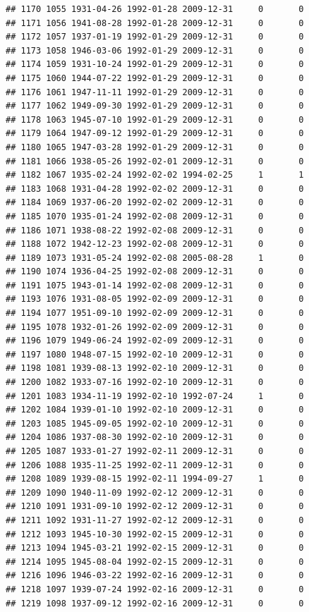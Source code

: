 \documentclass[
]{book}
\begin{document}
\begin{verbatim}
## 1170 1055 1931-04-26 1992-01-28 2009-12-31     0       0
## 1171 1056 1941-08-28 1992-01-28 2009-12-31     0       0
## 1172 1057 1937-01-19 1992-01-29 2009-12-31     0       0
## 1173 1058 1946-03-06 1992-01-29 2009-12-31     0       0
## 1174 1059 1931-10-24 1992-01-29 2009-12-31     0       0
## 1175 1060 1944-07-22 1992-01-29 2009-12-31     0       0
## 1176 1061 1947-11-11 1992-01-29 2009-12-31     0       0
## 1177 1062 1949-09-30 1992-01-29 2009-12-31     0       0
## 1178 1063 1945-07-10 1992-01-29 2009-12-31     0       0
## 1179 1064 1947-09-12 1992-01-29 2009-12-31     0       0
## 1180 1065 1947-03-28 1992-01-29 2009-12-31     0       0
## 1181 1066 1938-05-26 1992-02-01 2009-12-31     0       0
## 1182 1067 1935-02-24 1992-02-02 1994-02-25     1       1
## 1183 1068 1931-04-28 1992-02-02 2009-12-31     0       0
## 1184 1069 1937-06-20 1992-02-02 2009-12-31     0       0
## 1185 1070 1935-01-24 1992-02-08 2009-12-31     0       0
## 1186 1071 1938-08-22 1992-02-08 2009-12-31     0       0
## 1188 1072 1942-12-23 1992-02-08 2009-12-31     0       0
## 1189 1073 1931-05-24 1992-02-08 2005-08-28     1       0
## 1190 1074 1936-04-25 1992-02-08 2009-12-31     0       0
## 1191 1075 1943-01-14 1992-02-08 2009-12-31     0       0
## 1193 1076 1931-08-05 1992-02-09 2009-12-31     0       0
## 1194 1077 1951-09-10 1992-02-09 2009-12-31     0       0
## 1195 1078 1932-01-26 1992-02-09 2009-12-31     0       0
## 1196 1079 1949-06-24 1992-02-09 2009-12-31     0       0
## 1197 1080 1948-07-15 1992-02-10 2009-12-31     0       0
## 1198 1081 1939-08-13 1992-02-10 2009-12-31     0       0
## 1200 1082 1933-07-16 1992-02-10 2009-12-31     0       0
## 1201 1083 1934-11-19 1992-02-10 1992-07-24     1       0
## 1202 1084 1939-01-10 1992-02-10 2009-12-31     0       0
## 1203 1085 1945-09-05 1992-02-10 2009-12-31     0       0
## 1204 1086 1937-08-30 1992-02-10 2009-12-31     0       0
## 1205 1087 1933-01-27 1992-02-11 2009-12-31     0       0
## 1206 1088 1935-11-25 1992-02-11 2009-12-31     0       0
## 1208 1089 1939-08-15 1992-02-11 1994-09-27     1       0
## 1209 1090 1940-11-09 1992-02-12 2009-12-31     0       0
## 1210 1091 1931-09-10 1992-02-12 2009-12-31     0       0
## 1211 1092 1931-11-27 1992-02-12 2009-12-31     0       0
## 1212 1093 1945-10-30 1992-02-15 2009-12-31     0       0
## 1213 1094 1945-03-21 1992-02-15 2009-12-31     0       0
## 1214 1095 1945-08-04 1992-02-15 2009-12-31     0       0
## 1216 1096 1946-03-22 1992-02-16 2009-12-31     0       0
## 1218 1097 1939-07-24 1992-02-16 2009-12-31     0       0
## 1219 1098 1937-09-12 1992-02-16 2009-12-31     0       0

\end{verbatim}
\end{document}
